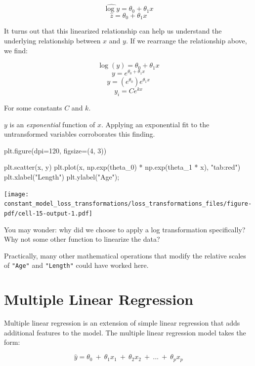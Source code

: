\documentclass[
  letterpaper,
  DIV=11,
  numbers=noendperiod]{scrreprt}
\newenvironment{Shaded}{\begin{snugshade}}{\end{snugshade}}
\newcommand{\DecValTok}[1]{\textcolor[rgb]{0.68,0.00,0.00}{#1}}
\newcommand{\NormalTok}[1]{\textcolor[rgb]{0.00,0.23,0.31}{#1}}
\newcommand{\OperatorTok}[1]{\textcolor[rgb]{0.37,0.37,0.37}{#1}}
\newcommand{\StringTok}[1]{\textcolor[rgb]{0.13,0.47,0.30}{#1}}
\begin{document}
\[\hat{\log{y}} = \theta_0 + \theta_1 x\]
\[\hat{z} = \theta_0 + \theta_1 x\]

It turns out that this linearized relationship can help us understand
the underlying relationship between \(x\) and \(y\). If we rearrange the
relationship above, we find:

\[\log{(y)} = \theta_0 + \theta_1 x\] \[y = e^{\theta_0 + \theta_1 x}\]
\[y = (e^{\theta_0})e^{\theta_1 x}\] \[y_i = C e^{k x}\]

For some constants \(C\) and \(k\).

\(y\) is an \emph{exponential} function of \(x\). Applying an
exponential fit to the untransformed variables corroborates this
finding.

\begin{Shaded}
\begin{Highlighting}[]
\NormalTok{plt.figure(dpi}\OperatorTok{=}\DecValTok{120}\NormalTok{, figsize}\OperatorTok{=}\NormalTok{(}\DecValTok{4}\NormalTok{, }\DecValTok{3}\NormalTok{))}

\NormalTok{plt.scatter(x, y)}
\NormalTok{plt.plot(x, np.exp(theta\_0) }\OperatorTok{*}\NormalTok{ np.exp(theta\_1 }\OperatorTok{*}\NormalTok{ x), }\StringTok{"tab:red"}\NormalTok{)}
\NormalTok{plt.xlabel(}\StringTok{"Length"}\NormalTok{)}
\NormalTok{plt.ylabel(}\StringTok{"Age"}\NormalTok{)}\OperatorTok{;}
\end{Highlighting}
\end{Shaded}

\texttt{[image: constant\_model\_loss\_transformations/loss\_transformations\_files/figure-pdf/cell-15-output-1.pdf]}

You may wonder: why did we choose to apply a log transformation
specifically? Why not some other function to linearize the data?

Practically, many other mathematical operations that modify the relative
scales of \texttt{"Age"} and \texttt{"Length"} could have worked here.

\section{Multiple Linear Regression}\label{multiple-linear-regression}

Multiple linear regression is an extension of simple linear regression
that adds additional features to the model. The multiple linear
regression model takes the form:

\[\hat{y} = \theta_0\:+\:\theta_1x_{1}\:+\:\theta_2 x_{2}\:+\:...\:+\:\theta_p x_{p}\]
\end{document}
